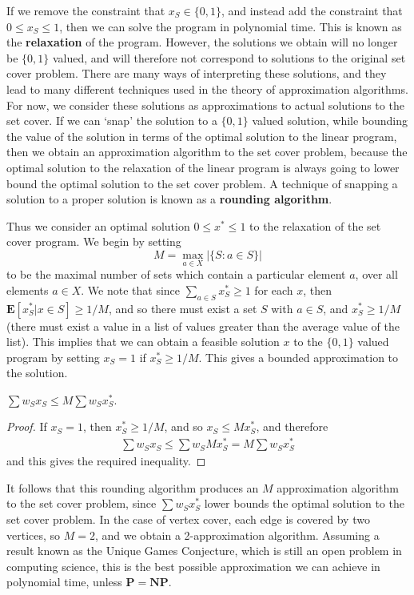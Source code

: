 If we remove the constraint that $x_S \in \{ 0, 1 \}$, and instead add the constraint that $0 \leq x_S \leq 1$, then we can solve the program in polynomial time. This is known as the {\bf relaxation} of the program. However, the solutions we obtain will no longer be $\{ 0, 1 \}$ valued, and will therefore not correspond to solutions to the original set cover problem. There are many ways of interpreting these solutions, and they lead to many different techniques used in the theory of approximation algorithms. For now, we consider these solutions as approximations to actual solutions to the set cover. If we can `snap' the solution to a $\{ 0, 1 \}$ valued solution, while bounding the value of the solution in terms of the optimal solution to the linear program, then we obtain an approximation algorithm to the set cover problem, because the optimal solution to the relaxation of the linear program is always going to lower bound the optimal solution to the set cover problem. A technique of snapping a solution to a proper solution is known as a {\bf rounding algorithm}.

Thus we consider an optimal solution $0 \leq x^* \leq 1$ to the relaxation of the set cover program. We begin by setting
%
\[ M = \max_{a \in X} |\{ S : a \in S \}| \]
%
to be the maximal number of sets which contain a particular element $a$, over all elements $a \in X$. We note that since $\sum_{a \in S} x^*_S \geq 1$ for each $x$, then $\mathbf{E}[x^*_S | x \in S] \geq 1/M$, and so there must exist a set $S$ with $a \in S$, and $x^*_S \geq 1/M$ (there must exist a value in a list of values greater than the average value of the list). This implies that we can obtain a feasible solution $x$ to the $\{ 0, 1 \}$ valued program by setting $x_S = 1$ if $x^*_S \geq 1/M$. This gives a bounded approximation to the solution.

\begin{lemma}
    $\sum w_S x_S \leq M \sum w_S x^*_S$.
\end{lemma}
\begin{proof}
    If $x_S = 1$, then $x_S^* \geq 1/M$, and so $x_S \leq Mx_S^*$, and therefore
    \begin{align*}
        \sum w_S x_S \leq \sum w_S Mx_S^* = M \sum w_S x_S^*
    \end{align*}
    and this gives the required inequality.
\end{proof}

It follows that this rounding algorithm produces an $M$ approximation algorithm to the set cover problem, since $\sum w_S x^*_S$ lower bounds the optimal solution to the set cover problem. In the case of vertex cover, each edge is covered by two vertices, so $M = 2$, and we obtain a 2-approximation algorithm. Assuming a result known as the Unique Games Conjecture, which is still an open problem in computing science, this is the best possible approximation we can achieve in polynomial time, unless $\mathbf{P} = \mathbf{NP}$.

